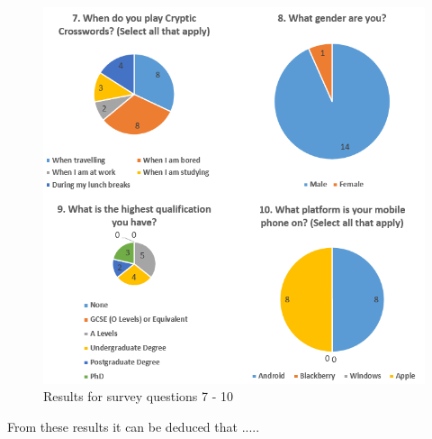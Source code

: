 \begin{figure}[H]
  \centering
  \includegraphics[scale=0.8]{graphs_7_10.png}
  \caption{Results for survey questions 7 - 10}
  \label{fig:graphs_7_10}
\end{figure}



From these results it can be deduced that .....

